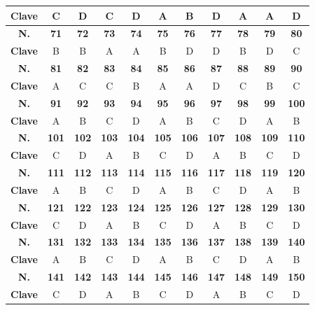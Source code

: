 \begin{center}
\begin{tabular}{|c|c|c|c|c|c|c|c|c|c|c|}
\hline
\textbf{Clave} & C & D & C & D & A & B & D & A & A & D \\
\hline
\textbf{N.} & \textbf{71} & \textbf{72} & \textbf{73} & \textbf{74} & \textbf{75} & \textbf{76} & \textbf{77} & \textbf{78} & \textbf{79} & \textbf{80} \\
\hline
\textbf{Clave} & B & B & A & A & B & D & D & B & D & C \\
\hline
\textbf{N.} & \textbf{81} & \textbf{82} & \textbf{83} & \textbf{84} & \textbf{85} & \textbf{86} & \textbf{87} & \textbf{88} & \textbf{89} & \textbf{90} \\
\hline
\textbf{Clave} & A & C & C & B & A & A & D & C & B & C \\
\hline
\textbf{N.} & \textbf{91} & \textbf{92} & \textbf{93} & \textbf{94} & \textbf{95} & \textbf{96} & \textbf{97} & \textbf{98} & \textbf{99} & \textbf{100} \\
\hline
\textbf{Clave} & A & B & C & D & A & B & C & D & A & B \\
\hline
\textbf{N.} & \textbf{101} & \textbf{102} & \textbf{103} & \textbf{104} & \textbf{105} & \textbf{106} & \textbf{107} & \textbf{108} & \textbf{109} & \textbf{110} \\
\hline
\textbf{Clave} & C & D & A & B & C & D & A & B & C & D \\
\hline
\textbf{N.} & \textbf{111} & \textbf{112} & \textbf{113} & \textbf{114} & \textbf{115} & \textbf{116} & \textbf{117} & \textbf{118} & \textbf{119} & \textbf{120} \\
\hline
\textbf{Clave} & A & B & C & D & A & B & C & D & A & B \\
\hline
\textbf{N.} & \textbf{121} & \textbf{122} & \textbf{123} & \textbf{124} & \textbf{125} & \textbf{126} & \textbf{127} & \textbf{128} & \textbf{129} & \textbf{130} \\
\hline
\textbf{Clave} & C & D & A & B & C & D & A & B & C & D \\
\hline
\textbf{N.} & \textbf{131} & \textbf{132} & \textbf{133} & \textbf{134} & \textbf{135} & \textbf{136} & \textbf{137} & \textbf{138} & \textbf{139} & \textbf{140} \\
\hline
\textbf{Clave} & A & B & C & D & A & B & C & D & A & B \\
\hline
\textbf{N.} & \textbf{141} & \textbf{142} & \textbf{143} & \textbf{144} & \textbf{145} & \textbf{146} & \textbf{147} & \textbf{148} & \textbf{149} & \textbf{150} \\
\hline
\textbf{Clave} & C & D & A & B & C & D & A & B & C & D \\

\end{tabular}
\end{center}
